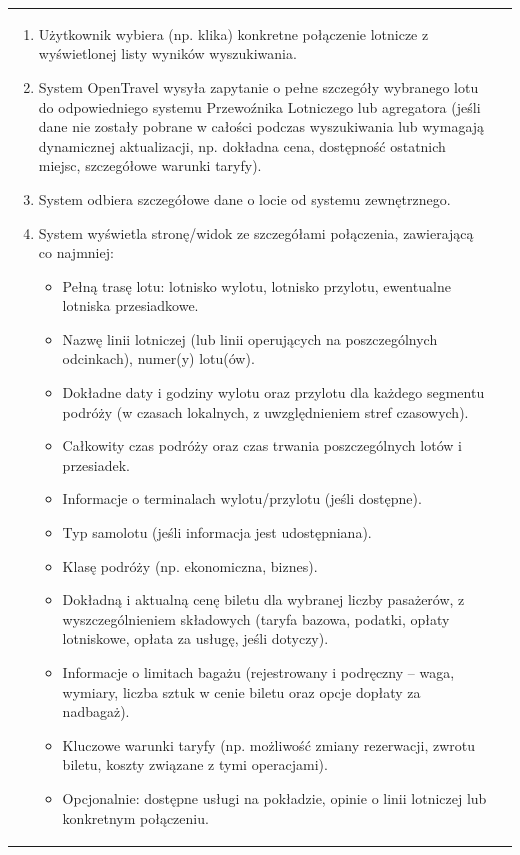 \documentclass[a4paper,12pt]{article}
\begin{document}
\begin{longtable}{|p{\pierwszakolumnaszerokoscPUBLSzczegoly}|p{\drugakolumnaszerokoscPUBLSzczegoly}|}
\begin{enumerate}
            \item Użytkownik wybiera (np. klika) konkretne połączenie lotnicze z wyświetlonej listy wyników wyszukiwania.
            \item System OpenTravel wysyła zapytanie o pełne szczegóły wybranego lotu do odpowiedniego systemu Przewoźnika Lotniczego lub agregatora (jeśli dane nie zostały pobrane w całości podczas wyszukiwania lub wymagają dynamicznej aktualizacji, np. dokładna cena, dostępność ostatnich miejsc, szczegółowe warunki taryfy).
            \item System odbiera szczegółowe dane o locie od systemu zewnętrznego.
            \item System wyświetla stronę/widok ze szczegółami połączenia, zawierającą co najmniej:
                \begin{itemize} \itemsep0pt \parskip0pt \parsep0pt
                    \item Pełną trasę lotu: lotnisko wylotu, lotnisko przylotu, ewentualne lotniska przesiadkowe.
                    \item Nazwę linii lotniczej (lub linii operujących na poszczególnych odcinkach), numer(y) lotu(ów).
                    \item Dokładne daty i godziny wylotu oraz przylotu dla każdego segmentu podróży (w czasach lokalnych, z uwzględnieniem stref czasowych).
                    \item Całkowity czas podróży oraz czas trwania poszczególnych lotów i przesiadek.
                    \item Informacje o terminalach wylotu/przylotu (jeśli dostępne).
                    \item Typ samolotu (jeśli informacja jest udostępniana).
                    \item Klasę podróży (np. ekonomiczna, biznes).
                    \item Dokładną i aktualną cenę biletu dla wybranej liczby pasażerów, z wyszczególnieniem składowych (taryfa bazowa, podatki, opłaty lotniskowe, opłata za usługę, jeśli dotyczy).
                    \item Informacje o limitach bagażu (rejestrowany i podręczny – waga, wymiary, liczba sztuk w cenie biletu oraz opcje dopłaty za nadbagaż).
                    \item Kluczowe warunki taryfy (np. możliwość zmiany rezerwacji, zwrotu biletu, koszty związane z tymi operacjami).
                    \item Opcjonalnie: dostępne usługi na pokładzie, opinie o linii lotniczej lub konkretnym połączeniu.

\end{itemize}
\end{enumerate}
\end{longtable}
\end{document}
